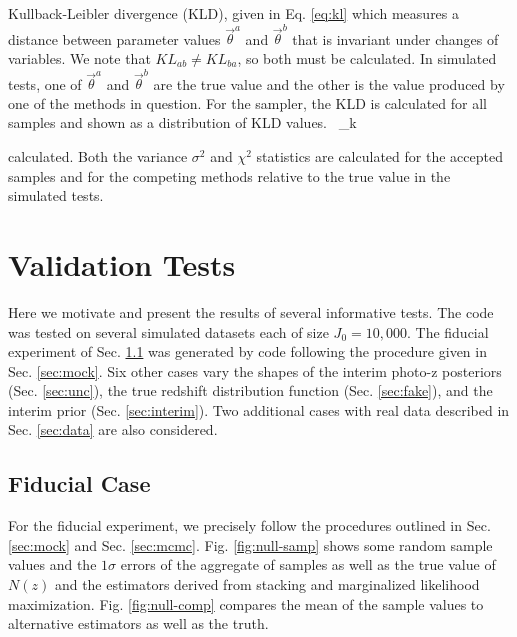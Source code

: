 \documentclass[preprint]{aastex}
\begin{document}
Kullback-Leibler divergence (KLD), given in Eq. \ref{eq:kl} which measures a 
distance between parameter values $\vec{\theta}^{a}$ and $\vec{\theta}^{b}$ 
that is invariant under changes of variables.  We note that $KL_{ab}\neq 
KL_{ba}$, so both must be calculated.  In simulated tests, one of 
$\vec{\theta}^{a}$ and $\vec{\theta}^{b}$ are the true value and the other is 
the value produced by one of the methods in question.  For the sampler, the KLD 
is calculated for all samples and shown as a distribution of KLD values.
%
\ln{}\ \Delta_{k}

calculated.  Both the variance $\sigma^{2}$ and $\chi^{2}$ statistics are 
calculated for the accepted samples and for the competing methods relative to 
the true value in the simulated tests.
%

\clearpage
\section{Validation Tests}
\label{sec:valid}

Here we motivate and present the results of several informative tests.  The 
code was tested on several simulated datasets each of size $J_{0}=10,000$.  The 
fiducial experiment of Sec. \ref{sec:null} was generated by code following the 
procedure given in Sec. \ref{sec:mock}.  Six other cases vary the shapes of the 
interim photo-z posteriors (Sec. \ref{sec:unc}), the true redshift distribution 
function (Sec. \ref{sec:fake}), and the interim prior (Sec. \ref{sec:interim}). 
 Two additional cases with real data described in Sec. \ref{sec:data} are also 
considered.

\clearpage
\subsection{Fiducial Case}
\label{sec:null}

For the fiducial experiment, we precisely follow the procedures outlined in 
Sec. \ref{sec:mock} and Sec. \ref{sec:mcmc}.  Fig. \ref{fig:null-samp} shows 
some random sample values and the $1\sigma$ errors of the aggregate of samples 
as well as the true value of $N(z)$ and the estimators derived from stacking 
and marginalized likelihood maximization.  Fig. \ref{fig:null-comp} compares 
the mean of the sample values to alternative estimators as well as the truth.
\end{document}
